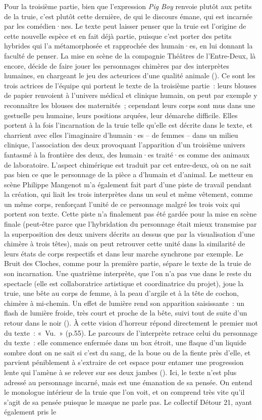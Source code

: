 \documentclass[
]{article}
\begin{document}
Pour la troisième partie, bien que l'expression \emph{Pig Boy} renvoie plutôt aux petits de la truie, c'est plutôt cette dernière, de qui le discours émane, qui est incarnée par les comédien·nes. Le texte peut laisser penser que la truie est l'origine de cette nouvelle espèce et en fait déjà partie, puisque c'est porter des petits hybrides qui l'a métamorphosée et rapprochée des humain·es, en lui donnant la faculté de penser. La mise en scène de la compagnie Théâtres de l'Entre-Deux, là encore, décide de faire jouer les personnages chimères par des interprètes humaines, en chargeant le jeu des acteurices d'une qualité animale (). Ce sont les trois actrices de l'équipe qui portent le texte de la troisième partie~: leurs blouses de papier renvoient à l'univers médical et clinique humain, on peut par exemple y reconnaître les blouses des maternités~; cependant leurs corps sont mus dans une gestuelle peu humaine, leurs positions arquées, leur démarche difficile. Elles portent à la fois l'incarnation de la truie telle qu'elle est décrite dans le texte, et charrient avec elles l'imaginaire d'humain·es -- de femmes -- dans un milieu clinique, l'association des deux provoquant l'apparition d'un troisième univers fantasmé à la frontière des deux, des humain·es traité·es comme des animaux de laboratoire. L'aspect chimérique est traduit par cet entre-deux, où on ne sait pas bien ce que le personnage de la pièce a d'humain et d'animal. Le metteur en scène Philippe Mangenot m'a également fait part d'une piste de travail pendant la création, qui liait les trois interprètes dans un seul et même vêtement, comme un même corps, renforçant l'unité de ce personnage malgré les trois voix qui portent son texte. Cette piste n'a finalement pas été gardée pour la mise en scène finale (peut-être parce que l'hybridation du personnage était mieux transmise par la superposition des deux univers décrits au dessus que par la visualisation d'une chimère à trois têtes), mais on peut retrouver cette unité dans la similarité de leurs états de corps respectifs et dans leur marche synchrone par exemple. Le Bruit des Cloches, comme pour la première partie, sépare le texte de la truie de son incarnation. Une quatrième interprète, que l'on n'a pas vue dans le reste du spectacle (elle est collaboratrice artistique et coordinatrice du projet), joue la truie, une bête au corps de femme, à la peau d'argile et à la tête de cochon, chimère à mi-chemin. Un effet de lumière rend son apparition saisissante~: un flash de lumière froide, très court et proche de la bête, suivi tout de suite d'un retour dans le noir (). À cette vision d'horreur répond directement le premier mot du texte~: «~Vu.~» (p.55). Le parcours de l'interprète retrace celui du personnage du texte~: elle commence enfermée dans un box étroit, une flaque d'un liquide sombre dont on ne sait si c'est du sang, de la boue ou de la fiente près d'elle, et parvient péniblement à s'extraire de cet espace pour entamer une progression lente qui l'amène à se relever sur ses deux jambes (). Ici, le texte n'est plus adressé au personnage incarné, mais est une émanation de sa pensée. On entend le monologue intérieur de la truie que l'on voit, et on comprend très vite qu'il s'agit de sa pensée puisque le masque ne parle pas. Le collectif Détour 21, ayant également pris le 
\end{document}
